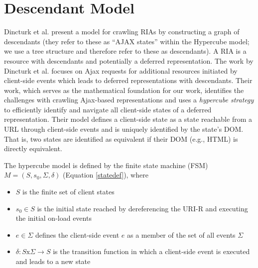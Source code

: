 \documentclass{sig-alternate}
\begin{document}
\section{Descendant Model}
Dincturk et al. \cite{dincturkAjax} present a model for crawling RIAs by constructing a graph of descendants (they refer to these as ``AJAX states'' within the Hypercube model; we use a tree structure and therefore refer to these as descendants). A RIA is a resource with descendants and potentially a deferred representation. The work by Dincturk et al. focuses on Ajax requests for additional resources initiated by client-side events which leads to deferred representations with descendants. Their work, which serves as the mathematical foundation for our work, identifies the challenges with crawling Ajax-based representations and uses a \emph{hypercube strategy} to efficiently identify and navigate all client-side states of a deferred representation. Their model defines a client-side state as a state reachable from a URL through client-side events and is uniquely identified by the state's DOM. That is, two states are identified as equivalent if their DOM (e.g., HTML) is directly equivalent.

The hypercube model is defined by the finite state machine (FSM) $M = (S, s_0, \Sigma, \delta)$ (Equation \ref{statedef}), where
\begin{itemize}
\item $S$ is the finite set of client states
\item $s_0 \in S$ is the initial state reached by dereferencing the URI-R and executing the initial on-load events
\item $e \in \Sigma$ defines the client-side event $e$ as a member of the set of all events $\Sigma$
\item $\delta : S \text{x} \Sigma \rightarrow S$ is the transition function in which a client-side event is executed and leads to a new state
\end{itemize}
\end{document}
